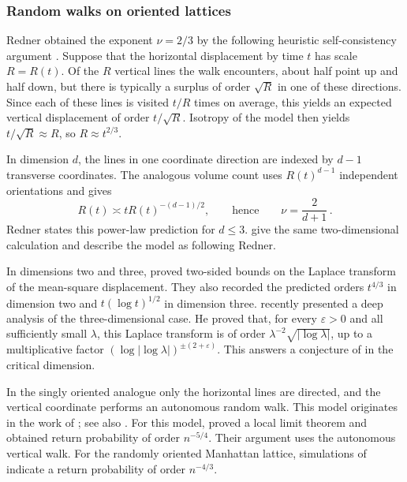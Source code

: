 \documentclass[11pt]{amsart}
\theoremstyle{plain}
\theoremstyle{definition}
\newcommand{\1}{\mathbf 1}
\newcommand{\abs}[1]{\lvert #1\rvert}
\begin{document}
\subsubsection{Random walks on oriented lattices}\label{sssec:oriented}

Redner obtained the exponent $\nu=2/3$ by the following heuristic self-consistency argument \citep*[p.~290]{Red89}.  Suppose that the   horizontal displacement by time $t$ has scale $R=R(t)$. Of the $R$ vertical lines the walk encounters, about half point up and half down, but there is typically a surplus of order $\sqrt{R}$ in one of these directions. Since each of these lines is visited    $t/R$ times on average, this yields an expected vertical displacement  of order $t/\sqrt{R}$. Isotropy of the model then yields  $t/\sqrt{R} \approx R$, so $R \approx t^{2/3}$. 
 
In dimension $d$, the lines in one coordinate direction are indexed by
$d-1$ transverse coordinates.  The analogous volume count uses
$R(t)^{d-1}$ independent orientations and gives
\[
  R(t)\asymp tR(t)^{-(d-1)/2},
  \qquad\text{hence}\qquad
  \nu=\frac{2}{d+1}\, .
\]
Redner states this power-law prediction for $d\leq3$.
\citet*[p.~152, item~\textup{(v)} and (1.73a)--(1.73b)]{BG90} give the same
two-dimensional calculation and describe the model as following Redner.

In dimensions two and three, \citet*[Theorem~1.1 and the discussion following
it]{LTV18} proved two-sided bounds on the Laplace transform of the mean-square
displacement.  They also recorded the predicted orders
$t^{4/3}$ in dimension two and $t(\log t)^{1/2}$ in dimension three.  
\citet*[Theorem~1.1]{Ngu26} recently presented a deep analysis of the three-dimensional case. He proved that, for every $\varepsilon>0$ and all
sufficiently small $\lambda$,   this Laplace transform  is of order
$\lambda^{-2}\sqrt{\abs{\log\lambda}}$,
up to a multiplicative factor
$(\log\abs{\log\lambda})^{\pm(2+\varepsilon)}$.  This answers a conjecture of
\citet*{LTV18} in the critical dimension.  


In the singly oriented analogue only the horizontal lines are directed, and
the vertical coordinate performs an autonomous random walk.  This model
originates in the work of \citet*{MdM80}; see also
\citet*[pp.~2--3]{LTV18}.  For this model, \citet*[Theorem~20]{CGPS11} proved a local limit
theorem  and obtained return probability of order $n^{-5/4}$.  Their
argument uses the autonomous vertical walk. For the randomly oriented Manhattan lattice, simulations of \citet*[Section~3.2]{MNOV20} indicate a return probability of
order $n^{-4/3}$.
\end{document}
